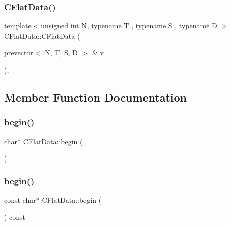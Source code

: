 \mbox{\label{class_c_flat_data_a050219ab3d7035ab56cf1de842eb74c6}} 
\subsubsection{\texorpdfstring{C\+Flat\+Data()}{CFlatData()}\hspace{0.1cm}{\footnotesize\ttfamily [3/3]}}
{\footnotesize\ttfamily template$<$unsigned int N, typename T , typename S , typename D $>$ \\
C\+Flat\+Data\+::\+C\+Flat\+Data (\begin{DoxyParamCaption}\item[{\mbox{\hyperlink{classprevector}{prevector}}$<$ N, T, S, D $>$ \&}]{v }\end{DoxyParamCaption})\hspace{0.3cm}{\ttfamily [inline]}, {\ttfamily [explicit]}}



\subsection{Member Function Documentation}
\mbox{\label{class_c_flat_data_ac8131cc3aec84905d7786fb19ff8953d}} 
\subsubsection{\texorpdfstring{begin()}{begin()}\hspace{0.1cm}{\footnotesize\ttfamily [1/2]}}
{\footnotesize\ttfamily char$\ast$ C\+Flat\+Data\+::begin (\begin{DoxyParamCaption}{ }\end{DoxyParamCaption})\hspace{0.3cm}{\ttfamily [inline]}}

\mbox{\label{class_c_flat_data_a0c771a8143c468a9f7add8b3d9736212}} 
\subsubsection{\texorpdfstring{begin()}{begin()}\hspace{0.1cm}{\footnotesize\ttfamily [2/2]}}
{\footnotesize\ttfamily const char$\ast$ C\+Flat\+Data\+::begin (\begin{DoxyParamCaption}{ }\end{DoxyParamCaption}) const\hspace{0.3cm}{\ttfamily [inline]}}

